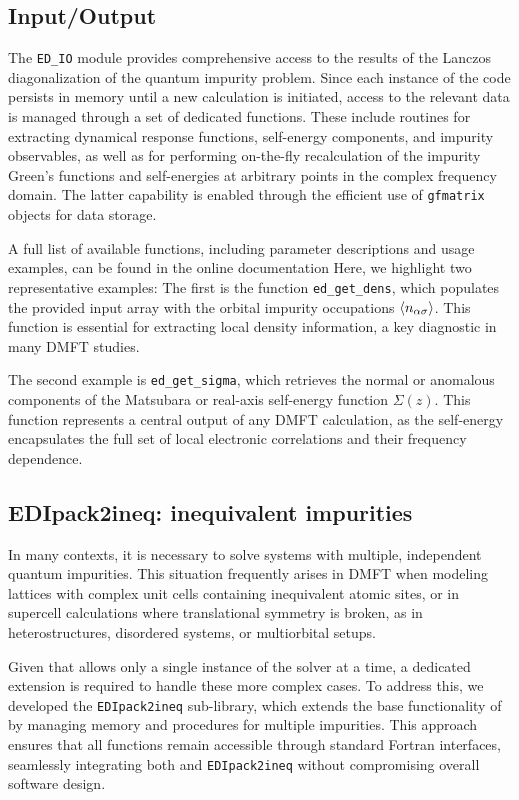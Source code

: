 \documentclass[edipack2.tex]{subfiles}
\begin{document}
\subsection{Input/Output}\label{sSecIO}
The \texttt{ED\_IO} module provides comprehensive access to the 
results of the Lanczos diagonalization of the quantum impurity 
problem. Since each instance of the code persists in memory until a 
new calculation is initiated, access to the relevant data is managed 
through a set of dedicated functions. These include routines for 
extracting dynamical response functions, self-energy components, and 
impurity observables, as well as for performing on-the-fly 
recalculation of the impurity Green's functions and self-energies at 
arbitrary points in the complex frequency domain. The latter 
capability is enabled through the efficient use of \texttt{gfmatrix} 
objects for data storage.

A full list of available functions, including parameter descriptions 
and usage examples, can be found in the online documentation 
Here, we highlight two representative examples:
The first is the function \texttt{ed\_get\_dens}, which populates the 
provided input array with the orbital impurity occupations 
$\langle n_{\alpha\sigma}\rangle$. This function is essential for extracting 
local density information, a key diagnostic in many DMFT studies.

The second example is \texttt{ed\_get\_sigma}, which retrieves the 
normal or anomalous components of the Matsubara or real-axis 
self-energy function $\Sigma(z)$. This function represents a central 
output of any DMFT calculation, as the self-energy encapsulates the 
full set of local electronic correlations and their frequency 
dependence.







\subsection{EDIpack2ineq: inequivalent impurities}\label{sSecIneq}
In many contexts, it is necessary to solve systems with multiple, 
independent quantum impurities. This situation frequently arises in 
DMFT when modeling lattices with complex unit cells containing 
inequivalent atomic sites, or in supercell calculations where 
translational symmetry is broken, as in heterostructures, disordered 
systems, or multiorbital setups. 

Given that \NAME allows only a single instance of the solver at a 
time, a dedicated extension is required to handle these more complex 
cases. To address this, we developed the {\tt EDIpack2ineq} 
sub-library, which extends the base functionality of \NAME by managing 
memory and procedures for multiple impurities. This approach ensures 
that all functions remain accessible through standard Fortran 
interfaces, seamlessly integrating both \NAME and {\tt EDIpack2ineq} 
without compromising overall software design.
\end{document}
